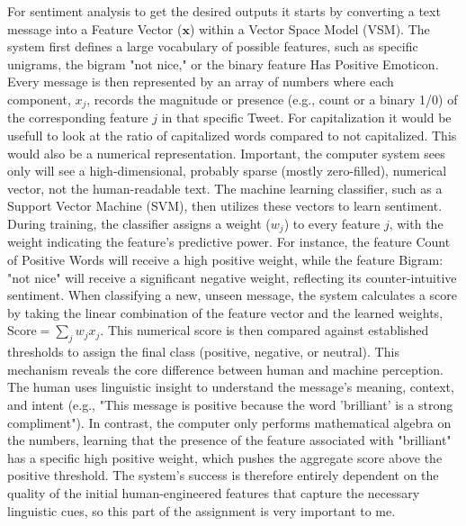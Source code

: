 \documentclass[11pt]{article}
\begin{document}
For sentiment analysis to get the desired outputs it starts by converting a text message into a Feature Vector ($\mathbf{x}$) within a Vector Space Model (VSM).
The system first defines a large vocabulary of possible features, such as specific unigrams, the bigram "not nice," or the binary feature Has Positive Emoticon.
Every message is then represented by an array of numbers where each component, $x_j$, records the magnitude or presence (e.g., count or a binary 1/0) of the corresponding feature $j$ in that specific Tweet.
For capitalization it would be usefull to look at the ratio of capitalized words compared to not capitalized. This would also be a numerical representation.
Important, the computer system sees only will see a high-dimensional, probably sparse (mostly zero-filled), numerical vector, not the human-readable text.
The machine learning classifier, such as a Support Vector Machine (SVM), then utilizes these vectors to learn sentiment.
During training, the classifier assigns a weight ($w_j$) to every feature $j$, with the weight indicating the feature's predictive power.
For instance, the feature Count of Positive Words will receive a high positive weight, while the feature Bigram: "not nice" will receive a significant negative weight, reflecting its counter-intuitive sentiment.
When classifying a new, unseen message, the system calculates a score by taking the linear combination of the feature vector and the learned weights, $\text{Score} = \sum_{j} w_j x_j$.
This numerical score is then compared against established thresholds to assign the final class (positive, negative, or neutral).
This mechanism reveals the core difference between human and machine perception.
The human uses linguistic insight to understand the message's meaning, context, and intent (e.g., "This message is positive because the word 'brilliant' is a strong compliment").
In contrast, the computer only performs mathematical algebra on the numbers, learning that the presence of the feature associated with "brilliant" has a specific high positive weight, which pushes the aggregate score above the positive threshold.
The system's success is therefore entirely dependent on the quality of the initial human-engineered features that capture the necessary linguistic cues, so this part of the assignment is very important to me.
\end{document}
